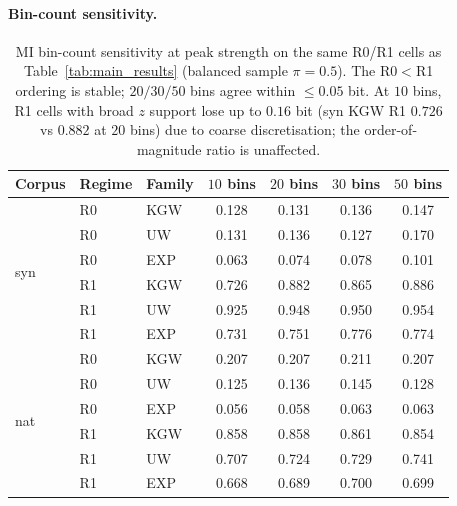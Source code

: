 \documentclass[11pt]{article}
\begin{document}
\paragraph{Bin-count sensitivity.}
\begin{table}[h]
\centering\small
\caption{MI bin-count sensitivity at peak strength on the same R0/R1 cells
as Table~\ref{tab:main_results} (balanced sample $\pi{=}0.5$). The
R0$<$R1 ordering is stable; $20/30/50$ bins agree within $\leq 0.05$ bit.
At $10$ bins, R1 cells with broad $z$ support lose up to $0.16$ bit
(syn KGW R1 $0.726$ vs $0.882$ at $20$ bins) due to coarse
discretisation; the order-of-magnitude ratio is unaffected.}
\label{tab:bin_sens}
\begin{tabular}{l l l c c c c}
\toprule
Corpus & Regime & Family & $10$ bins & $20$ bins & $30$ bins & $50$ bins \\
\midrule
\multirow{6}{*}{syn} & R0 & KGW & 0.128 & 0.131 & 0.136 & 0.147 \\
                     & R0 & UW  & 0.131 & 0.136 & 0.127 & 0.170 \\
                     & R0 & EXP & 0.063 & 0.074 & 0.078 & 0.101 \\
                     & R1 & KGW & 0.726 & 0.882 & 0.865 & 0.886 \\
                     & R1 & UW  & 0.925 & 0.948 & 0.950 & 0.954 \\
                     & R1 & EXP & 0.731 & 0.751 & 0.776 & 0.774 \\
\midrule
\multirow{6}{*}{nat} & R0 & KGW & 0.207 & 0.207 & 0.211 & 0.207 \\
                     & R0 & UW  & 0.125 & 0.136 & 0.145 & 0.128 \\
                     & R0 & EXP & 0.056 & 0.058 & 0.063 & 0.063 \\
                     & R1 & KGW & 0.858 & 0.858 & 0.861 & 0.854 \\
                     & R1 & UW  & 0.707 & 0.724 & 0.729 & 0.741 \\
                     & R1 & EXP & 0.668 & 0.689 & 0.700 & 0.699 \\
\bottomrule
\end{tabular}
\end{table}
\end{document}
